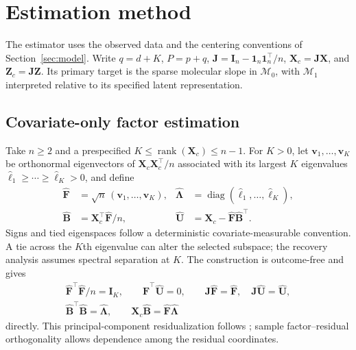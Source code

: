 \section{Estimation method}
\label{sec:estimation}

The estimator uses the observed data and the centering conventions of Section~\ref{sec:model}. Write $q=d+K$, $P=p+q$, $\bm{J}=\bm{I}_n-\mathbf 1_n\mathbf 1_n^\top/n$, $\bm{X}_c=\bm{J}\bm{X}$, and $\bm{Z}_c=\bm{J}\bm{Z}$. Its primary target is the sparse molecular slope in $\mathcal M_0$, with $\mathcal M_1$ interpreted relative to its specified latent representation.

\subsection{Covariate-only factor estimation}
\label{subsec:pca-estimator}
Take $n\ge2$ and a prespecified $K\le\operatorname{rank}(\bm{X}_c)\le n-1$. For $K>0$, let $\bm{v}_1,\ldots,\bm{v}_K$ be orthonormal eigenvectors of $\bm{X}_c\bm{X}_c^\top/n$ associated with its largest $K$ eigenvalues $\widehat\ell_1\ge\cdots\ge\widehat\ell_K>0$, and define
\begin{equation}
 \begin{aligned}
 \widehat{\bm{F}}&=\sqrt n\,(\bm{v}_1,\ldots,\bm{v}_K),&
 \widehat{\bm{\Lambda}}&=\operatorname{diag}(\widehat\ell_1,\ldots,\widehat\ell_K),\\
 \widehat{\bm{B}}&=\bm{X}_c^\top\widehat{\bm{F}}/n,&
 \widehat{\bm{U}}&=\bm{X}_c-\widehat{\bm{F}}\widehat{\bm{B}}^\top.
 \end{aligned}
 \label{eq:pca-construction}
\end{equation}
Signs and tied eigenspaces follow a deterministic covariate-measurable convention. A tie across the $K$th eigenvalue can alter the selected subspace; the recovery analysis assumes spectral separation at $K$. The construction is outcome-free and gives
\begin{equation}
 \begin{gathered}
 \widehat{\bm{F}}^\top\widehat{\bm{F}}/n=\bm{I}_K,\qquad
 \widehat{\bm{F}}^\top\widehat{\bm{U}}=0,\qquad
 \bm{J}\widehat{\bm{F}}=\widehat{\bm{F}},\quad \bm{J}\widehat{\bm{U}}=\widehat{\bm{U}},\\
 \widehat{\bm{B}}^\top\widehat{\bm{B}}=\widehat{\bm{\Lambda}},\qquad
 \bm{X}_c\widehat{\bm{B}}=\widehat{\bm{F}}\widehat{\bm{\Lambda}}
 \end{gathered}
 \label{eq:pca-identities}
\end{equation}
directly. This principal-component residualization follows \citet{FanEtAl2020}; sample factor--residual orthogonality allows dependence among the residual coordinates.

